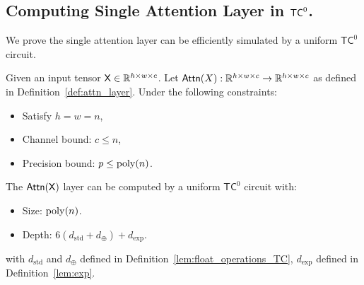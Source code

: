 \subsection{Computing Single Attention Layer in \texorpdfstring{$\mathsf{TC}^0$}{}.} \label{sec:attention_tc0}
 We prove the single attention layer can be efficiently simulated by a uniform $\mathsf{TC}^0$ circuit.
\begin{lemma}\label{lem:attn_tc0_informal}
     Given an input tensor $\mathsf{X} \in \mathbb{R}^{h \times w \times c}$. Let $\mathsf{Attn}(X):\mathbb{R}^{h \times w \times c} \to \mathbb{R}^{h \times w \times c}$ as defined in Definition~\ref{def:attn_layer}. Under the following constraints:
     \begin{itemize}
         \item Satisfy $h = w = n$,
         \item Channel bound: $c \leq n$,
         \item Precision bound: $p \leq \operatorname{poly}(n)$.
     \end{itemize}
     The $\mathsf{Attn}(\mathsf{X})$ layer can be computed by a uniform $\mathsf{TC}^0$ circuit with:
     \begin{itemize}
        \item Size: $\operatorname{poly}(n)$.
        \item Depth: $6(d_{\mathrm{std}} + d_{\oplus}) + d_{\exp}$.
     \end{itemize}    
     with $d_{\mathrm{std}}$ and $d_{\oplus}$ defined in Definition~\ref{lem:float_operations_TC}, $d_{\exp}$ defined in Definition~\ref{lem:exp}.
\end{lemma}



